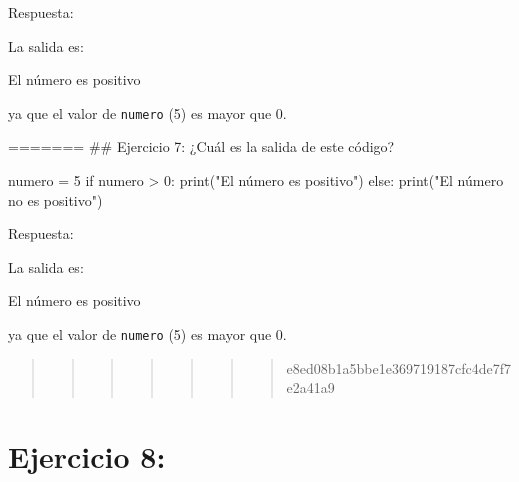 \documentclass[
  a4paper,
  onepage,
  openany]{scrreprt}
\newenvironment{Shaded}{\begin{snugshade}}{\end{snugshade}}
\newcommand{\BuiltInTok}[1]{\textcolor[rgb]{0.00,0.23,0.31}{#1}}
\newcommand{\ControlFlowTok}[1]{\textcolor[rgb]{0.00,0.23,0.31}{#1}}
\newcommand{\DecValTok}[1]{\textcolor[rgb]{0.68,0.00,0.00}{#1}}
\newcommand{\ExtensionTok}[1]{\textcolor[rgb]{0.00,0.23,0.31}{#1}}
\newcommand{\NormalTok}[1]{\textcolor[rgb]{0.00,0.23,0.31}{#1}}
\newcommand{\OperatorTok}[1]{\textcolor[rgb]{0.37,0.37,0.37}{#1}}
\newcommand{\StringTok}[1]{\textcolor[rgb]{0.13,0.47,0.30}{#1}}
\begin{document}
Respuesta:

La salida es:

\begin{Shaded}
\begin{Highlighting}[]
\ExtensionTok{El}\NormalTok{ número es positivo}
\end{Highlighting}
\end{Shaded}

ya que el valor de \texttt{numero} (5) es mayor que 0.

======= \#\# Ejercicio 7: ¿Cuál es la salida de este código?

\begin{Shaded}
\begin{Highlighting}[]
\NormalTok{numero }\OperatorTok{=} \DecValTok{5}
\ControlFlowTok{if}\NormalTok{ numero }\OperatorTok{\textgreater{}} \DecValTok{0}\NormalTok{:}
    \BuiltInTok{print}\NormalTok{(}\StringTok{"El número es positivo"}\NormalTok{)}
\ControlFlowTok{else}\NormalTok{:}
    \BuiltInTok{print}\NormalTok{(}\StringTok{"El número no es positivo"}\NormalTok{)}
\end{Highlighting}
\end{Shaded}

Respuesta:

La salida es:

\begin{Shaded}
\begin{Highlighting}[]
\ExtensionTok{El}\NormalTok{ número es positivo}
\end{Highlighting}
\end{Shaded}

ya que el valor de \texttt{numero} (5) es mayor que 0.

\begin{quote}
\begin{quote}
\begin{quote}
\begin{quote}
\begin{quote}
\begin{quote}
\begin{quote}
e8ed08b1a5bbe1e369719187cfc4de7f7e2a41a9
\end{quote}
\end{quote}
\end{quote}
\end{quote}
\end{quote}
\end{quote}
\end{quote}

\hypertarget{ejercicio-8}{%
\chapter{Ejercicio 8:}\label{ejercicio-8}}
\end{document}
